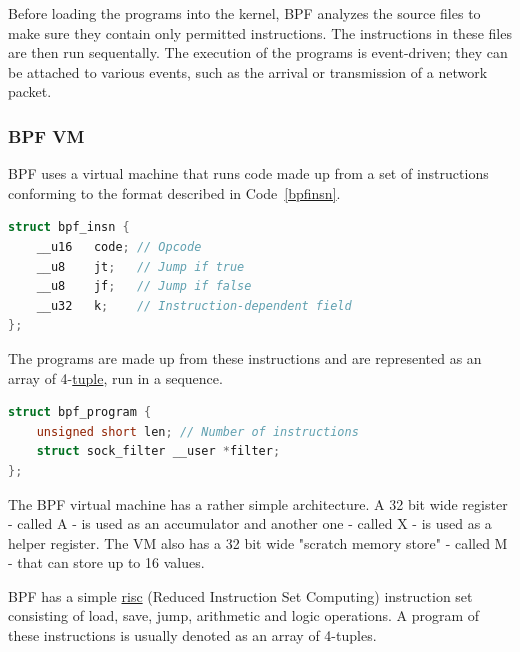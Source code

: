 Before loading the programs into the kernel, BPF analyzes the source files to make sure they contain only permitted instructions. The instructions in these files are then run sequentally. The execution of the programs is event-driven; they can be attached to various events, such as the arrival or transmission of a network packet.
 
\subsubsection{BPF VM}
BPF uses a virtual machine that runs code made up from a set of instructions conforming to the format described in Code~\ref{bpfinsn}.
\begin{lstlisting}[language={C++}]
struct bpf_insn {
	__u16	code; // Opcode
	__u8	jt;	  // Jump if true
	__u8	jf;   // Jump if false
	__u32	k;    // Instruction-dependent field
};
\end{lstlisting}

The programs are made up from these instructions and are represented as an array of 4-\underline{\gls{tuple}}, run in a sequence.

\begin{lstlisting}[language={C++}]
struct bpf_program {
	unsigned short len; // Number of instructions
	struct sock_filter __user *filter;
};
\end{lstlisting}

The BPF virtual machine has a rather simple architecture. A 32 bit wide register - called A - is used as an accumulator and another one - called X - is used as a helper register. The VM also has a 32 bit wide "scratch memory store" - called M - that can store up to 16 values.

BPF has a simple \underline{\gls{risc}} (Reduced Instruction Set Computing) instruction set consisting of load, save, jump, arithmetic and logic operations. A program of these instructions is usually denoted as an array of 4-tuples. \\
 
